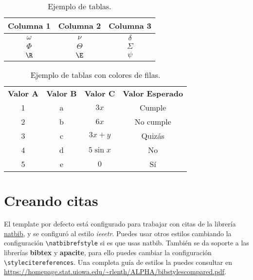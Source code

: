 	\begin{table}[H] %
		\centering
		\caption{Ejemplo de tablas.}
		\begin{tabular}{ccc}
			\hline
			\textbf{Columna 1} & \textbf{Columna 2} & \textbf{Columna 3} \bigstrut\\
			\hline
			$\omega$ & $\nu$ & $\delta$ \bigstrut[t]\\
			$\Phi$ & $\Theta$ & $\varSigma$ \\
			$\R$ & $\E$ & $\psi$ \\
			\hline
		\end{tabular}
		\label{tab:tabla-1}
	\end{table}
	
	\enabletablerowcolor
	\begin{table}[H]
		\centering
		\caption{Ejemplo de tablas con colores de filas.}
		\begin{tabular}{ccccc}
			\rowcolor[rgb]{ .749,  .749,  .749} \textbf{Valor A} & \textbf{Valor B} & \textbf{Valor C} & \multicolumn{2}{c}{\textbf{Valor Esperado}} \\
			1     & a     & $3x$  & \multicolumn{2}{c}{Cumple} \\
			2     & b     & $6x$  & \multicolumn{2}{c}{No cumple} \\
			3     & c     & $3x+y$ & \multicolumn{2}{c}{Quizás} \\
			4     & d     & $5\sin x$ & \multicolumn{2}{c}{No} \\
			5     & e     & $0$ & \multicolumn{2}{c}{Sí} \\
		\end{tabular}
	\end{table}
	\disabletablerowcolor
	
\section{Creando citas}

El template por defecto está configurado para trabajar con citas de la librería \href{https://www.ctan.org/pkg/natbib}{natbib}, y se configuró al estilo \textit{ieeetr}. Puedes usar otros estilos cambiando la configuración \texttt{\textbackslash natbibrefstyle} si es que usas natbib. También se da soporte a las librerías \textbf{bibtex} y \textbf{apacite}, para ello puedes cambiar la configuración \texttt{\textbackslash stylecitereferences}. Una completa guía de estilos la puedes consultar en \url{https://homepage.stat.uiowa.edu/~rlenth/ALPHA/bibstylescompared.pdf}. \\

